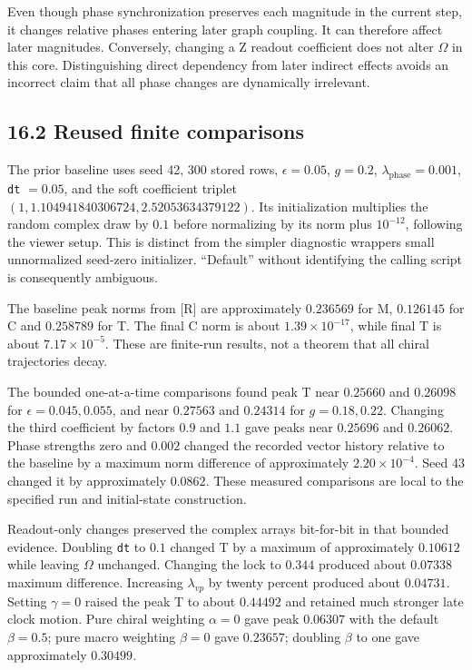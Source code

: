 \documentclass[
  11pt,
  a4paper,
]{article}
\begin{document}
Even though phase synchronization preserves each magnitude in the current step, it changes relative phases entering later graph coupling. It can therefore affect later magnitudes. Conversely, changing a Z readout coefficient does not alter \(\Omega\) in this core. Distinguishing direct dependency from later indirect effects avoids an incorrect claim that all phase changes are dynamically irrelevant.

\subsection{16.2 Reused finite comparisons}\label{reused-finite-comparisons}

The prior baseline uses seed 42, 300 stored rows, \(\epsilon=0.05\), \(g=0.2\), \(\lambda_{\mathrm{phase}}=0.001\), \texttt{dt} \(=0.05\), and the soft coefficient triplet \((1,1.104941840306724,2.52053634379122)\). Its initialization multiplies the random complex draw by \(0.1\) before normalizing by its norm plus \(10^{-12}\), following the viewer setup. This is distinct from the simpler diagnostic wrapper\textquotesingle s small unnormalized seed-zero initializer. ``Default'' without identifying the calling script is consequently ambiguous.

The baseline peak norms from {[}R{]} are approximately \(0.236569\) for M, \(0.126145\) for C and \(0.258789\) for T. The final C norm is about \(1.39\times10^{-17}\), while final T is about \(7.17\times10^{-5}\). These are finite-run results, not a theorem that all chiral trajectories decay.

The bounded one-at-a-time comparisons found peak T near \(0.25660\) and \(0.26098\) for \(\epsilon=0.045,0.055\), and near \(0.27563\) and \(0.24314\) for \(g=0.18,0.22\). Changing the third coefficient by factors \(0.9\) and \(1.1\) gave peaks near \(0.25696\) and \(0.26062\). Phase strengths zero and \(0.002\) changed the recorded vector history relative to the baseline by a maximum norm difference of approximately \(2.20\times10^{-4}\). Seed 43 changed it by approximately \(0.0862\). These measured comparisons are local to the specified run and initial-state construction.

Readout-only changes preserved the complex arrays bit-for-bit in that bounded evidence. Doubling \texttt{dt} to \(0.1\) changed T by a maximum of approximately \(0.10612\) while leaving \(\Omega\) unchanged. Changing the lock to \(0.344\) produced about \(0.07338\) maximum difference. Increasing \(\lambda_{vp}\) by twenty percent produced about \(0.04731\). Setting \(\gamma=0\) raised the peak T to about \(0.44492\) and retained much stronger late clock motion. Pure chiral weighting \(\alpha=0\) gave peak \(0.06307\) with the default \(\beta=0.5\); pure macro weighting \(\beta=0\) gave \(0.23657\); doubling \(\beta\) to one gave approximately \(0.30499\).
\end{document}
